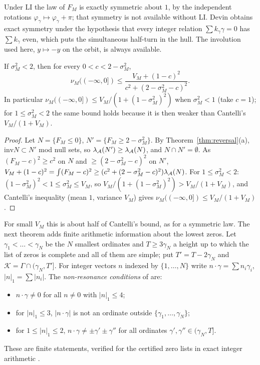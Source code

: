 Under LI the law of $F_M$ is exactly symmetric about $1$, by the independent rotations $\varphi_\gamma\mapsto\varphi_\gamma+\pi$; that symmetry is not available without LI. Devin \cite[Theorem~2.3]{Devin} obtains exact symmetry under the hypothesis that every integer relation $\sum k_\gamma\gamma=0$ has $\sum k_\gamma$ even, which puts the simultaneous half-turn in the hull. The involution used here, $y\mapsto-y$ on the orbit, is always available.

\begin{theorem}\label{thm:cheb52}
If $\sigma_M^2<2$, then for every $0<c<2-\sigma_M^2$,
\[
\nu_M((-\infty,0])\le\frac{V_M+(1-c)^2}{c^2+(2-\sigma_M^2-c)^2}.
\]
In particular $\nu_M((-\infty,0])\le V_M/(1+(1-\sigma_M^2)^2)$ when $\sigma_M^2<1$ (take $c=1$); for $1\le\sigma_M^2<2$ the same bound holds because it is then weaker than Cantelli's $V_M/(1+V_M)$.
\end{theorem}

\begin{proof}
Let $N=\{F_M\le0\}$, $N'=\{F_M\ge2-\sigma_M^2\}$. By Theorem~\ref{thm:reversal}(a), $\mathrm{inv}N\subset N'$ mod null sets, so $\lambda_{\mathcal A}(N')\ge\lambda_{\mathcal A}(N)$, and $N\cap N'=\emptyset$. As $(F_M-c)^2\ge c^2$ on $N$ and $\ge(2-\sigma_M^2-c)^2$ on $N'$, $V_M+(1-c)^2=\int(F_M-c)^2\ge(c^2+(2-\sigma_M^2-c)^2)\lambda_{\mathcal A}(N)$. For $1\le\sigma_M^2<2$: $(1-\sigma_M^2)^2<1\le\sigma_M^2\le V_M$, so $V_M/(1+(1-\sigma_M^2)^2)>V_M/(1+V_M)$, and Cantelli's inequality (mean $1$, variance $V_M$) gives $\nu_M((-\infty,0])\le V_M/(1+V_M)$.
\end{proof}

For small $V_M$ this is about half of Cantelli's bound, as for a symmetric law. The next theorem adds finite arithmetic information about the lowest zeros. Let $\gamma_1<\dots<\gamma_N$ be the $N$ smallest ordinates and $T\ge3\gamma_N$ a height up to which the list of zeros is complete and all of them are simple; put $T'=T-2\gamma_N$ and $\mathcal K=\Gamma\cap(\gamma_N,T']$. For integer vectors $n$ indexed by $\{1,\dots,N\}$ write $n\cdot\gamma=\sum n_i\gamma_i$, $|n|_1=\sum|n_i|$. The \emph{non-resonance conditions} of \cite[\S6]{GO} are:
\begin{itemize}
\item[(NR1)] $n\cdot\gamma\ne0$ for all $n\ne0$ with $|n|_1\le4$;
\item[(NR2)] for $|n|_1\le3$, $|n\cdot\gamma|$ is not an ordinate outside $\{\gamma_1,\dots,\gamma_N\}$;
\item[(NR3)] for $1\le|n|_1\le2$, $n\cdot\gamma\ne\pm\gamma'\pm\gamma''$ for all ordinates $\gamma',\gamma''\in(\gamma_N,T]$.
\end{itemize}
These are finite statements, verified for the certified zero lists in exact integer arithmetic \cite{GO}.

